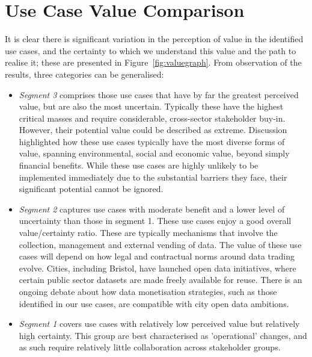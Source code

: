 \documentclass[b5paper,10pt]{article}
\begin{document}
\section{Use Case Value Comparison}\label{usecasecomp}


It is clear there is significant variation in the perception of value
in the identified use cases, and the certainty to which we understand
this value and the path to realise it; these are presented in
Figure~\ref{fig:valuegraph}. From observation of the results, three
categories can be generalised:

\begin{itemize}
\item {\emph{Segment 3}} comprises those use cases that have by far
the greatest perceived value, but are also the most
uncertain. Typically these have the highest critical masses and
require considerable, cross-sector stakeholder buy-in. However, their
potential value could be described as extreme. Discussion highlighted
how these use cases typically have the most diverse forms of value,
spanning environmental, social and economic value, beyond simply
financial benefits. While these use cases are highly unlikely to be
implemented immediately due to the substantial barriers they face,
their significant potential cannot be ignored.
\item {\emph{Segment 2}} captures use cases with moderate benefit and
a lower level of uncertainty than those in segment 1. These use cases
enjoy a good overall value/certainty ratio. These are typically
mechanisms that involve the collection, management and external
vending of data. The value of these use cases will depend on how legal
and contractual norms around data trading evolve. Cities, including
Bristol, have launched open data initiatives, where certain public
sector datasets are made freely available for reuse. There is an
ongoing debate about how data monetisation strategies, such as those
identified in our use cases, are compatible with city open data
ambitions.
\item {\emph{Segment 1}} covers use cases with relatively low
perceived value but relatively high certainty. This group are best
characterised as 'operational' changes, and as such require relatively
little collaboration across stakeholder groups.
\end{itemize}
\end{document}
